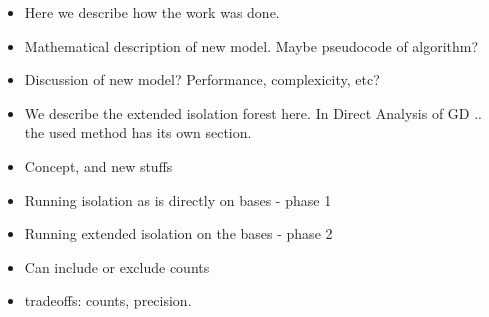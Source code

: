 \begin{itemize}
    \item Here we describe how the work was done.
    \item Mathematical description of new model. Maybe pseudocode of algorithm? 
    \item Discussion of new model? Performance, complexicity, etc? 
    \item We describe the extended isolation forest here. In Direct Analysis of GD .. the used method has its own section. 
    \item Concept, and new stuffs
    \item Running isolation as is directly on bases - phase 1
    \item Running extended isolation on the bases  - phase 2
    \item Can include or exclude counts 
    \item tradeoffs: counts, precision. 
\end{itemize}